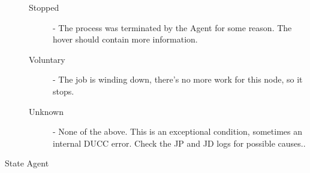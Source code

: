 \begin{description}
\begin{description}
                \item[Stopped]	- The process was terminated by the Agent for some reason.  The hover should
                  contain more information.
                          
                \item[Voluntary] - The job is winding down, there's no more work for this node, so it stops. 
                  
                \item[Unknown] - None of the above. This is an exceptional condition, sometimes an
                  internal DUCC error. Check the JP and JD logs for possible causes..
            \end{description}

          \item[State Agent] \hfill \\
          \label{itm:job-details-state}


\end{description}
